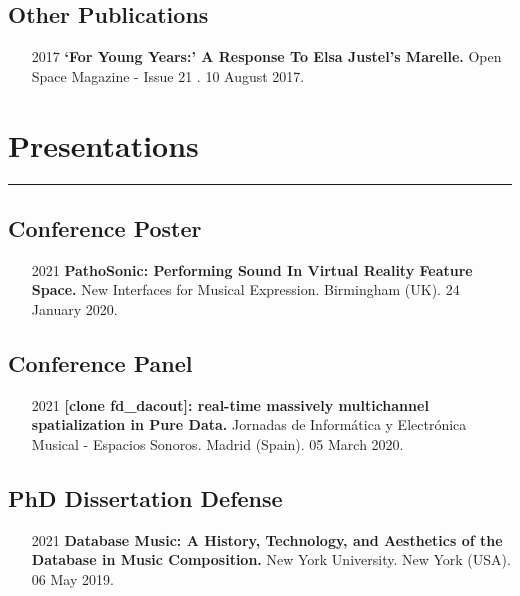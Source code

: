 \documentclass[12pt]{article}%
\begin{document}
\subsection{Other Publications}%
\begin{itemize}[align=parleft,leftmargin=2.25cm,labelwidth=2cm]
\item[2017]
\textbf{`For Young Years:' A Response To Elsa Justel's Marelle.}
Open Space Magazine {-} Issue 21 . 
10 August 2017.
\end{itemize}

%
\section{Presentations}%
\label{sec:Presentations}%
\hrule%
\subsection{Conference Poster}%
\begin{itemize}[align=parleft,leftmargin=2.25cm,labelwidth=2cm]
\item[2021]
\textbf{PathoSonic: Performing Sound In Virtual Reality Feature Space.}
New Interfaces for Musical Expression. 
Birmingham (UK). 
24 January 2020.
\end{itemize}%
\subsection{Conference Panel}%
\begin{itemize}[align=parleft,leftmargin=2.25cm,labelwidth=2cm]
\item[2021]
\textbf{{[}clone fd\_dacout{]}: real{-}time massively multichannel spatialization in Pure Data.}
Jornadas de Informática y Electrónica Musical {-} Espacios Sonoros. 
Madrid (Spain). 
05 March 2020.
\end{itemize}%
\subsection{PhD Dissertation Defense}%
\begin{itemize}[align=parleft,leftmargin=2.25cm,labelwidth=2cm]
\item[2021]
\textbf{Database Music: A History, Technology, and Aesthetics of the Database in Music Composition.}
New York University. 
New York (USA). 
06 May 2019.
\end{itemize}%
\end{document}
